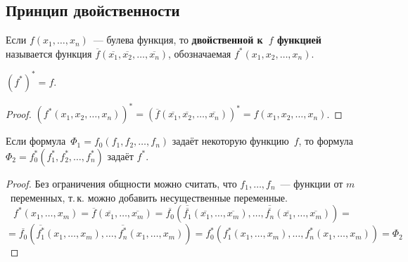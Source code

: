\subsection{Принцип двойственности}
 Если $f(x_1, \ldots, x_n)$~--- булева функция, то \textbf{двойственной к~$f$ функцией} называется функция $\overline f(\overline{x_1}, \overline{x_2}, \ldots, \overline{x_n})$, обозначаемая $f^*(x_1, x_2, \ldots, x_n)$.

\begin{statement}
$(f^*)^* = f$.
\end{statement}
\begin{proof}
$(f^*(x_1, x_2, \ldots, x_n))^*
= (\overline f(\overline{x_1}, \overline{x_2}, \ldots, \overline{x_n}))^*
= f(x_1, x_2, \ldots, x_n)$.
\end{proof}

\begin{theorem}
Если формула~$\Phi_1 = f_0(f_1, f_2, \ldots, f_n)$ задаёт некоторую функцию~$f$, то формула~$\Phi_2 = f_0^*(f_1^*, f_2^*, \ldots, f_n^*)$ задаёт $f^*$.
\end{theorem}
\begin{proof}
Без ограничения общности можно считать, что $f_1, \ldots, f_n$~--- функции от $m$~переменных, т.\,к. можно добавить несущественные переменные.
\begin{equation*}
f^*(x_1, \ldots, x_m) =
\overline f(\overline{x_1}, \ldots, \overline{x_m}) =
\overline{f_0}(\overline{\overline{f_1}}(\overline{x_1}, \ldots, \overline{x_m}), \ldots, \overline{\overline{f_n}}(\overline{x_1}, \ldots, \overline{x_m})) =
\end{equation*}
\begin{equation*}
= \overline{f_0}(\overline{f_1^*}(x_1, \ldots, x_m), \ldots, \overline{f_n^*}(x_1, \ldots, x_m)) =
f_0^*(f_1^*(x_1, \ldots, x_m), \ldots, f_n^*(x_1, \ldots, x_m)) =
\Phi_2
\end{equation*}
\end{proof}